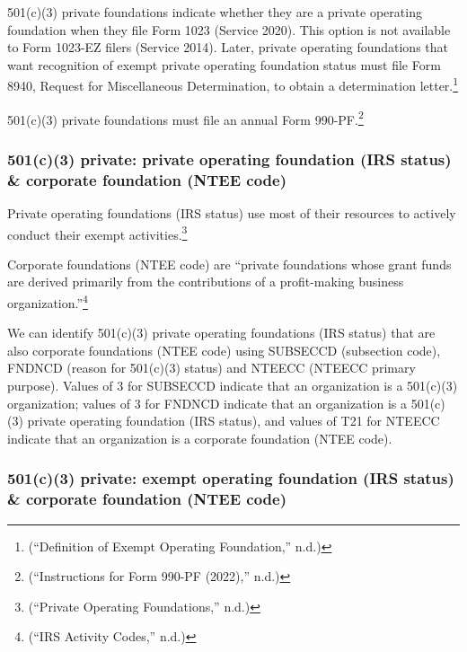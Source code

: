 \documentclass[
  letterpaper,
  DIV=11,
  numbers=noendperiod,
  oneside]{scrreprt}
\begin{document}
501(c)(3) private foundations indicate whether they are a private
operating foundation when they file Form 1023 (Service 2020). This
option is not available to Form 1023-EZ filers (Service 2014). Later,
private operating foundations that want recognition of exempt private
operating foundation status must file Form 8940, Request for
Miscellaneous Determination, to obtain a determination
letter.\footnote{({``Definition of Exempt Operating Foundation,''} n.d.)}

501(c)(3) private foundations must file an annual Form
990-PF.\footnote{({``Instructions for Form 990-PF (2022),''} n.d.)}

\hypertarget{c3-private-private-operating-foundation-irs-status-corporate-foundation-ntee-code}{%
\subsubsection{501(c)(3) private: private operating foundation (IRS
status) \& corporate foundation (NTEE
code)}\label{c3-private-private-operating-foundation-irs-status-corporate-foundation-ntee-code}}

Private operating foundations (IRS status) use most of their resources
to actively conduct their exempt activities.\footnote{({``Private
  Operating Foundations,''} n.d.)}

Corporate foundations (NTEE code) are ``private foundations whose grant
funds are derived primarily from the contributions of a profit-making
business organization.''\footnote{({``IRS Activity Codes,''} n.d.)}

We can identify 501(c)(3) private operating foundations (IRS status)
that are also corporate foundations (NTEE code) using SUBSECCD
(subsection code), FNDNCD (reason for 501(c)(3) status) and NTEECC
(NTEECC primary purpose). Values of 3 for SUBSECCD indicate that an
organization is a 501(c)(3) organization; values of 3 for FNDNCD
indicate that an organization is a 501(c)(3) private operating
foundation (IRS status), and values of T21 for NTEECC indicate that an
organization is a corporate foundation (NTEE code).

\hypertarget{c3-private-exempt-operating-foundation-irs-status-corporate-foundation-ntee-code}{%
\subsubsection{501(c)(3) private: exempt operating foundation (IRS
status) \& corporate foundation (NTEE
code)}\label{c3-private-exempt-operating-foundation-irs-status-corporate-foundation-ntee-code}}
\end{document}
